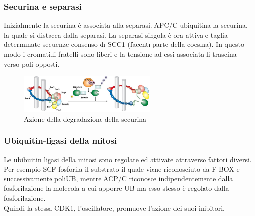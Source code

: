         \subsubsection{Securina e separasi}
            Inizialmente la securina è associata alla separasi.
            APC/C ubiquitina la securina, la quale si distacca dalla separasi. La separasi singola è ora attiva e taglia determinate sequenze consenso di SCC1 (facenti parte della coesina). In questo modo i cromatidi fratelli sono liberi e la tensione ad essi associata li trascina verso poli opposti.
        
            \begin{figure}[h]
                \centering
                \includegraphics[width=0.6\textwidth]{images/securina_separasi.JPG}
                \caption{\small Azione della degradazione della securina}
                \label{fig:mesh1}
            \end{figure}
        
        \subsubsection{Ubiquitin-ligasi della mitosi}
            Le ubibuitin ligasi della mitosi sono regolate ed attivate attraverso fattori diversi. 
            Per esempio SCF fosforila il substrato il quale viene riconosciuto da F-BOX e successivamente poliUB, mentre ACP/C riconosce indipendentemente dalla fosforilazione la molecola a cui apporre UB ma esso stesso è regolato dalla fosforilazione.\\
            Quindi la stessa CDK1, l'oscillatore, promuove l'azione dei suoi inibitori.\\
            
